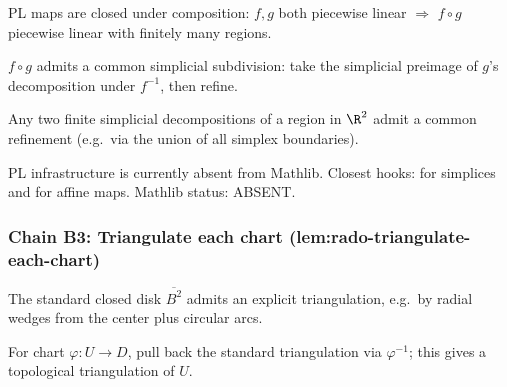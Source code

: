 \begin{lemma}
\label{lem:rpc-r2}
PL maps are closed under composition: $f, g$ both piecewise linear $\Rightarrow$ $f\circ g$ piecewise linear with finitely many regions.
\leanok
\end{lemma}

\begin{lemma}
\label{lem:rpc-r3}
$f\circ g$ admits a common simplicial subdivision: take the simplicial preimage of $g$'s decomposition under $f^{-1}$, then refine.
\leanok
\end{lemma}

\begin{lemma}
\label{lem:rpc-r4}
Any two finite simplicial decompositions of a region in $\R^{2}$ admit a common refinement (e.g.\ via the union of all simplex boundaries).
\leanok
\end{lemma}

\begin{lemma}
\label{lem:rpc-r5}
PL infrastructure is currently absent from Mathlib.  Closest hooks:  for simplices and  for affine maps.  Mathlib status: ABSENT.
\leanok
\end{lemma}

\subsubsection*{Chain B3: Triangulate each chart (lem:rado-triangulate-each-chart)}

\begin{lemma}
\label{lem:rtc-r1}
The standard closed disk $\overline{B^{2}}$ admits an explicit triangulation, e.g.\ by radial wedges from the center plus circular arcs.
\leanok
\end{lemma}

\begin{lemma}
\label{lem:rtc-r2}
For chart $\varphi : U \to D$, pull back the standard triangulation via $\varphi^{-1}$; this gives a topological triangulation of $U$.
\leanok
\end{lemma}

